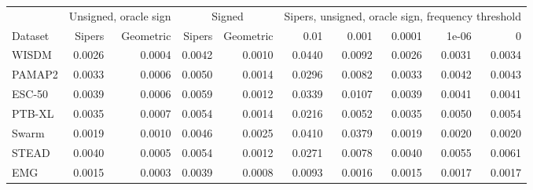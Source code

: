 \begin{tabular}{@{}lrrrrrrrrr@{}}
\toprule
& \multicolumn{2}{c}{Unsigned, oracle sign} & \multicolumn{2}{c}{Signed} & \multicolumn{5}{c}{Sipers, unsigned, oracle sign, frequency threshold} \\
\cmidrule(lr){2-3}\cmidrule(lr){4-5}\cmidrule(l){6-10}
Dataset & Sipers & Geometric & Sipers & Geometric & 0.01 & 0.001 & 0.0001 & 1e-06 & 0 \\
\midrule
WISDM & 0.0026 & 0.0004 & 0.0042 & 0.0010 & 0.0440 & 0.0092 & 0.0026 & 0.0031 & 0.0034 \\
PAMAP2 & 0.0033 & 0.0006 & 0.0050 & 0.0014 & 0.0296 & 0.0082 & 0.0033 & 0.0042 & 0.0043 \\
ESC-50 & 0.0039 & 0.0006 & 0.0059 & 0.0012 & 0.0339 & 0.0107 & 0.0039 & 0.0041 & 0.0041 \\
PTB-XL & 0.0035 & 0.0007 & 0.0054 & 0.0014 & 0.0216 & 0.0052 & 0.0035 & 0.0050 & 0.0054 \\
Swarm & 0.0019 & 0.0010 & 0.0046 & 0.0025 & 0.0410 & 0.0379 & 0.0019 & 0.0020 & 0.0020 \\
STEAD & 0.0040 & 0.0005 & 0.0054 & 0.0012 & 0.0271 & 0.0078 & 0.0040 & 0.0055 & 0.0061 \\
EMG & 0.0015 & 0.0003 & 0.0039 & 0.0008 & 0.0093 & 0.0016 & 0.0015 & 0.0017 & 0.0017 \\
\bottomrule
\end{tabular}
